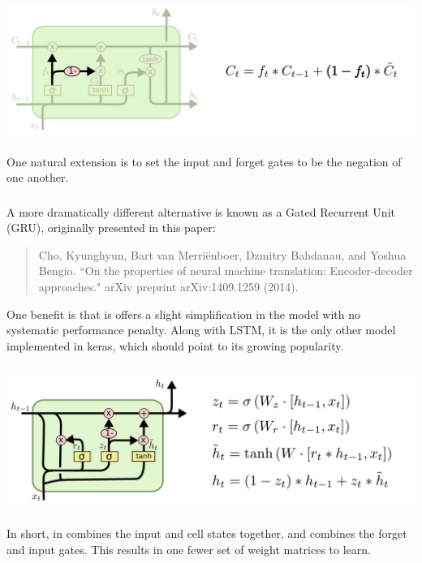 \documentclass[xetex,mathserif,serif,aspectratio=169]{beamer}
\begin{document}
\begin{frame}[fragile] \frametitle{} \oldB \small

\begin{center}
\includegraphics[height=4.5cm]{img/cloah14.png}
\end{center}

One natural extension is to set the input and forget
gates to be the negation of one another.

\end{frame}

\begin{frame}[fragile] \frametitle{} \oldB \small

A more dramatically different alternative is known as
a Gated Recurrent Unit (GRU), originally presented in this
paper:
\begin{quote}
Cho, Kyunghyun, Bart van Merriënboer, Dzmitry Bahdanau,
and Yoshua Bengio. ``On the properties of neural machine
translation: Encoder-decoder approaches."
arXiv preprint arXiv:1409.1259 (2014).
\end{quote}
One benefit is that is offers a slight simplification in
the model with no systematic performance penalty. Along
with LSTM, it is the only other model implemented in
keras, which should point to its growing popularity.

\end{frame}

\begin{frame}[fragile] \frametitle{} \oldB \small

\begin{center}
\includegraphics[height=4.5cm]{img/cloah15.png}
\end{center}

In short, in combines the input and cell states together,
and combines the forget and input gates. This results in
one fewer set of weight matrices to learn.

\end{frame}
\end{document}
